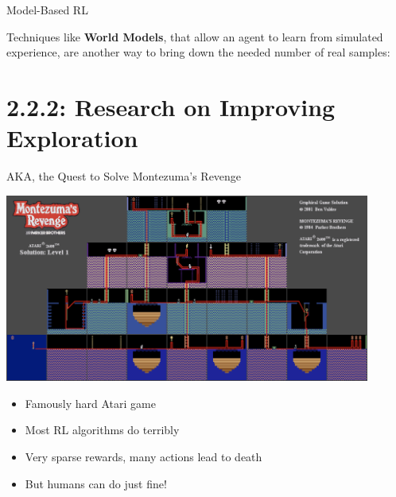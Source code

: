 \documentclass[9pt]{beamer}
\begin{document}
\begin{frame}{Model-Based RL}

Techniques like \textbf{World Models}, that allow an agent to learn from simulated experience, are another way to bring down the needed number of real samples:

\begin{center}
\end{center}


\end{frame}


\section{2.2.2: Research on Improving Exploration}

\begin{frame}{AKA, the Quest to Solve Montezuma's Revenge}

\begin{center}
\includegraphics[width=0.9\textwidth]{p2-montezuma}
\end{center}

\begin{itemize}
\item Famously hard Atari game
\item Most RL algorithms do terribly
\item Very sparse rewards, many actions lead to death
\item But humans can do just fine!
\end{itemize}

\end{frame}
\end{document}
